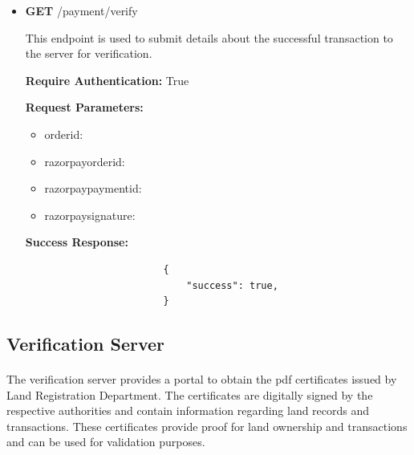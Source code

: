 \documentclass[12pt]{article}
\begin{document}
\begin{itemize}
            \item \textbf{GET}  /payment/verify
                \begin{addmargin}[1em]{2em}%
                    This endpoint is used to submit details about the successful transaction to the server for verification.
                    \par\textbf{Require Authentication:} True
                    \par\textbf{Request Parameters:}
                    \begin{itemize}
                        \item order\textunderscore id:
                        \item razorpay\textunderscore order\textunderscore id:
                        \item razorpay\textunderscore payment\textunderscore id:
                        \item razorpay\textunderscore signature:
                    \end{itemize}
                    \par\textbf{Success Response:}
                    \begin{listing}[H]
                    \begin{verbatim}
                        {     
                            "success": true,
                        }
                    \end{verbatim}
                   \end{listing}
                \end{addmargin}
        
        \end{itemize}

    \subsection{Verification Server}
        \paragraph{}
        The verification server provides a portal to obtain the \acrshort{pdf} certificates issued by Land Registration Department. The certificates are digitally signed by the respective authorities and contain information regarding land records and transactions. These certificates provide proof for land ownership and transactions and can be used for validation purposes.
        
\end{document}

